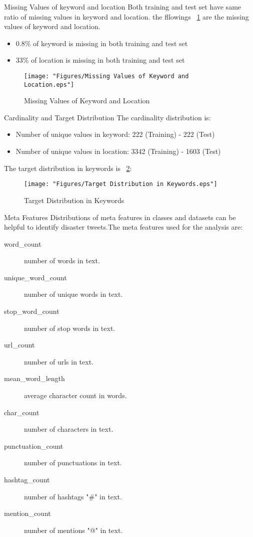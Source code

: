 \documentclass[
 size=12pt,
 paper=smartboard, %
 mode=present, %
 display=slides, %
 style=tuliplab,  %
 pauseslide,
 fleqn,leqno,clock]{powerdot}
\begin{document}
\begin{slide}{Missing Values of keyword and location}
	Both training and test set have same ratio 
	of missing values in keyword and location.
	the fllowings ~\cref{fig:missing-values-of-keyword-and-location} are the  
	missing values of keyword and location.
	\begin{itemize}
		\item
		0.8\% of keyword is missing in both training and test set
		\item
		33\% of location is missing in both training and test set
	\end{itemize}

\begin{figure}[tbph]
	\centering
	\texttt{[image: "Figures/Missing Values of Keyword and Location.eps"]}
	\caption{Missing Values of Keyword and Location}
	\label{fig:missing-values-of-keyword-and-location}
\end{figure}
\end{slide}

\begin{slide}{Cardinality and Target Distribution}
The cardinality distribution is:
\begin{itemize}
	\item
	Number of unique values in keyword: 222 (Training) - 222 (Test)
	\item
	Number of unique values in location: 3342 (Training) - 1603 (Test)
\end{itemize}
The target distribution in keywords is ~\cref{fig:Target-Distribution-in-Keywords}:
\begin{figure}[tbph]
	\centering
	\texttt{[image: "Figures/Target Distribution in Keywords.eps"]}
	\caption{Target Distribution in Keywords}
	\label{fig:Target-Distribution-in-Keywords}
\end{figure}
\end{slide}


\begin{slide}{Meta Features}
Distributions of meta features in classes and datasets 
can be helpful to identify disaster tweets.The meta 
features used for the analysis are:

\begin{description}
	\item[word\_count] number of words in text.
	\item[unique\_word\_count] number of unique words in text.
	\item[stop\_word\_count] number of stop words in text.
	\item[url\_count] number of urls in text.
	\item[mean\_word\_length] average character count in words.
	\item[char\_count] number of characters in text.
	\item[punctuation\_count] number of punctuations in text.
	\item[hashtag\_count] number of hashtags "\#" in text.
	\item[mention\_count] number of mentions "@" in text.
\end{description}
\end{slide}
\end{document}
